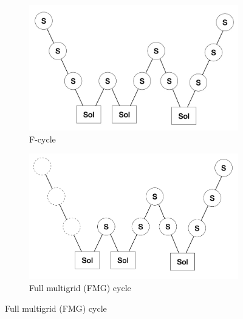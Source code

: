 \begin{figure}[h!]
	\begin{subfigure}{0.45\columnwidth}
		\centering
        \includegraphics[width=\columnwidth]{MG_Fcycle.jpeg}
        \caption{F-cycle}
	\end{subfigure}
	\begin{subfigure}{0.45\columnwidth}
		\centering
        \includegraphics[width=\columnwidth]{MG_FMG.jpeg}
        \caption{Full multigrid (FMG) cycle}
	\end{subfigure}


\end{figure}
